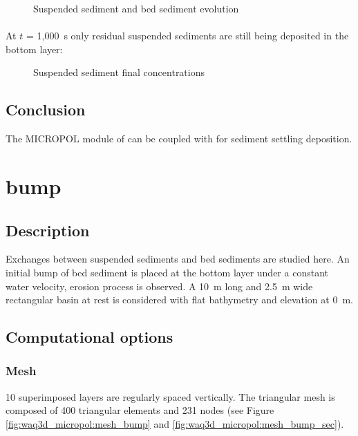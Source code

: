 \begin{figure}[H]
 \centering
\caption{Suspended sediment and bed sediment evolution}
 \label{fig:waq3d_micropol:res_sed}
\end{figure}

\paragraph{}
At $t$ = 1,000~s only residual suspended sediments are still being deposited in the bottom layer:

\begin{figure}[H]
 \centering
\caption{Suspended sediment final concentrations}
 \label{fig:waq3d_micropol:ss_f}
\end{figure}


\subsection{Conclusion}

The MICROPOL module of \waqtel can be coupled with  for sediment settling deposition.


\section{bump}

\subsection{Description}
Exchanges between suspended sediments and bed sediments are studied here. An initial bump of bed sediment is placed at the bottom layer under a constant water velocity, erosion process is observed.
A 10~m long and 2.5~m wide rectangular basin at rest is considered
with flat bathymetry and elevation at 0~m.

\subsection{Computational options}

\subsubsection{Mesh}
10 superimposed layers are regularly spaced vertically.
The triangular mesh is composed of 400 triangular elements and
231 nodes (see Figure \ref{fig:waq3d_micropol:mesh_bump} and \ref{fig:waq3d_micropol:mesh_bump_sec}).


